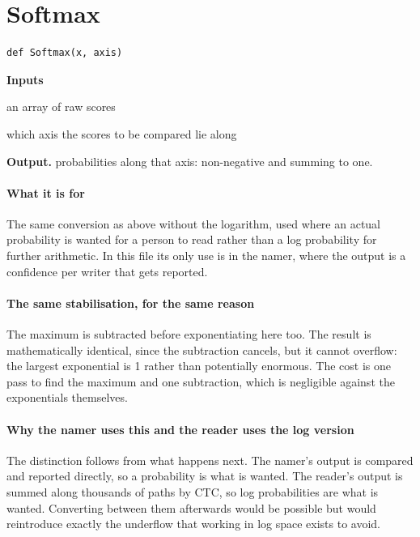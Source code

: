 \section{Softmax}
\begin{lstlisting}[style=sig]
def Softmax(x, axis)
\end{lstlisting}

\noindent\textbf{Inputs}
\begin{description}[leftmargin=2.2em,style=nextline,font=\normalfont\ttfamily]\setlength\itemsep{1pt}
  \item[{x}] \normalfont an array of raw scores
  \item[{axis}] \normalfont which axis the scores to be compared lie along
\end{description}

\noindent\textbf{Output.} probabilities along that axis: non-negative and summing to one.


\paragraph{What it is for}
The same conversion as above without the logarithm, used where an actual probability is wanted for a person to read rather than a log probability for further arithmetic. In this file its only use is in the namer, where the output is a confidence per writer that gets reported.


\paragraph{The same stabilisation, for the same reason}
The maximum is subtracted before exponentiating here too. The result is mathematically identical, since the subtraction cancels, but it cannot overflow: the largest exponential is 1 rather than potentially enormous. The cost is one pass to find the maximum and one subtraction, which is negligible against the exponentials themselves.


\paragraph{Why the namer uses this and the reader uses the log version}
The distinction follows from what happens next. The namer's output is compared and reported directly, so a probability is what is wanted. The reader's output is summed along thousands of paths by CTC, so log probabilities are what is wanted. Converting between them afterwards would be possible but would reintroduce exactly the underflow that working in log space exists to avoid.


